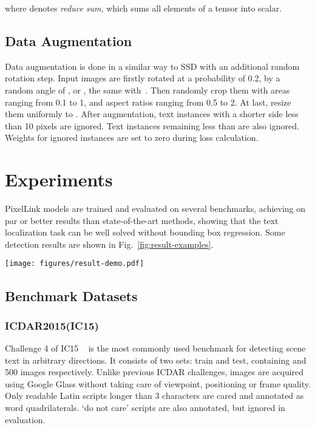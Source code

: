 \documentclass[letterpaper]{article} \usepackage{aaai18}  \usepackage{times}  \usepackage{helvet}  \usepackage{courier}  \usepackage{url}  \usepackage{graphicx}
\begin{document}
	where  denotes \emph{reduce sum}, which sums all elements of a tensor into scalar.
	
	\subsection{Data Augmentation}
	Data augmentation is done in a similar way to SSD with an additional random rotation step. Input images are firstly rotated at a probability of 0.2, by a random angle of , or , the same with~\cite{He2017DDR}. Then randomly crop them with areas ranging from 0.1 to 1, and aspect ratios ranging from 0.5 to 2. At last, resize them uniformly to .
	After augmentation, text instances with a shorter side less than 10 pixels are ignored. Text instances remaining less than  are also ignored. Weights for ignored instances are set to zero during loss calculation.
	
	\section{Experiments}
	\label{sec:benchmark-results}
	PixelLink models are trained and evaluated on several benchmarks, achieving on par or better results than state-of-the-art methods, showing that the text localization task can be well solved without bounding box regression. Some detection results are shown in \mbox{Fig.~\ref{fig:result-examples}}. 
	\begin{figure*}
		\begin{center}
			\texttt{[image: figures/result-demo.pdf]}
		\end{center}
		\caption{Examples of detection results. From left to right in columns: IC15, IC13, and MSRA-TD500.}
		\label{fig:result-examples}
	\end{figure*}
	\subsection{Benchmark Datasets}
	\subsubsection{ICDAR2015(IC15)}
	Challenge 4 of IC15 ~\cite{Karatzas2015ICDAR} is the most commonly used benchmark for detecting scene text in arbitrary directions. It consists of two sets: train and test, containing  and 500 images respectively. Unlike previous ICDAR challenges, images are acquired using Google Glass without taking care of viewpoint, positioning or frame quality. Only readable Latin scripts longer than 3 characters are cared and annotated as word quadrilaterals. `do not care' scripts are also annotated, but ignored in evaluation.
\end{document}
